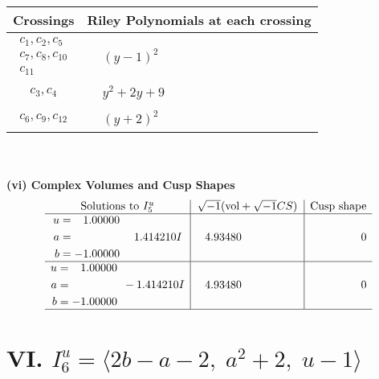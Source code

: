 \documentclass[1p]{elsarticle_modified}
\theoremstyle{definition}
\newcommand{\I}{\sqrt{-1}}
\begin{document}
\begin{tabular}{m{50pt}|m{274pt}}
Crossings & \hspace{64pt}Riley Polynomials at each crossing \\
\hline $$\begin{aligned}c_{1},c_{2},c_{5}\\c_{7},c_{8},c_{10}\\c_{11}\end{aligned}$$&$\begin{aligned}
&(y-1)^2
\end{aligned}$\\
\hline $$\begin{aligned}c_{3},c_{4}\end{aligned}$$&$\begin{aligned}
&y^2+2 y+9
\end{aligned}$\\
\hline $$\begin{aligned}c_{6},c_{9},c_{12}\end{aligned}$$&$\begin{aligned}
&(y+2)^2
\end{aligned}$\\
\hline
\end{tabular}\\~\\
\newpage\flushleft \textbf{(vi) Complex Volumes and Cusp Shapes}
$$\begin{array}{c|c|c}  
\text{Solutions to }I^u_{5}& \I (\text{vol} + \sqrt{-1}CS) & \text{Cusp shape}\\
 \hline 
\begin{aligned}
u &= \phantom{-}1.00000\phantom{ +0.000000I} \\
a &= \phantom{-0.000000 -}1.414210 I \\
b &= -1.00000\phantom{ +0.000000I}\end{aligned}
 & \phantom{-}4.93480\phantom{ +0.000000I} & \phantom{-0.000000 } 0 \\ \hline\begin{aligned}
u &= \phantom{-}1.00000\phantom{ +0.000000I} \\
a &= \phantom{-0.000000 } -1.414210 I \\
b &= -1.00000\phantom{ +0.000000I}\end{aligned}
 & \phantom{-}4.93480\phantom{ +0.000000I} & \phantom{-0.000000 } 0\\
 \hline 
 \end{array}$$\newpage\newpage\renewcommand{\arraystretch}{1}
\centering \section*{VI. $I^u_{6}= \langle 2 b- a-2,\;a^2+2,\;u-1 \rangle$}
\end{document}
